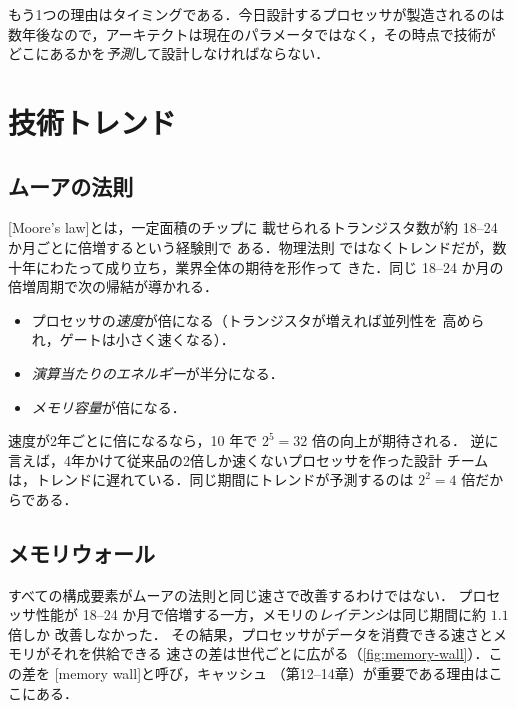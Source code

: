 \documentclass[../main.tex]{subfiles}
\begin{document}
もう1つの理由はタイミングである．今日設計するプロセッサが製造されるのは
数年後なので，アーキテクトは現在のパラメータではなく，その時点で技術が
どこにあるかを\emph{予測}して設計しなければならない．

\section{技術トレンド}

\subsection{ムーアの法則}

[Moore's law]とは，一定面積のチップに
載せられるトランジスタ数が約 18--24 か月ごとに倍増するという経験則で
ある．物理法則
ではなくトレンドだが，数十年にわたって成り立ち，業界全体の期待を形作って
きた．同じ 18--24 か月の倍増周期で次の帰結が導かれる．
\begin{itemize}
  \item プロセッサの\emph{速度}が倍になる（トランジスタが増えれば並列性を
    高められ，ゲートは小さく速くなる）．
  \item \emph{演算当たりのエネルギー}が半分になる．
  \item \emph{メモリ容量}が倍になる．
\end{itemize}

\begin{example}
  速度が2年ごとに倍になるなら，10 年で $2^{5} = 32$ 倍の向上が期待される．
  逆に言えば，4年かけて従来品の2倍しか速くないプロセッサを作った設計
  チームは，トレンドに遅れている．同じ期間にトレンドが予測するのは
  $2^{2} = 4$ 倍だからである．
\end{example}

\subsection{メモリウォール}

すべての構成要素がムーアの法則と同じ速さで改善するわけではない．
プロセッサ性能が 18--24
か月で倍増する一方，メモリの\emph{レイテンシ}は同じ期間に約 $1.1$ 倍しか
改善しなかった．
その結果，プロセッサがデータを消費できる速さとメモリがそれを供給できる
速さの差は世代ごとに広がる（\cref{fig:memory-wall}）．この差を
[memory wall]と呼び，キャッシュ
（第12--14章）が重要である理由はここにある．
\end{document}
